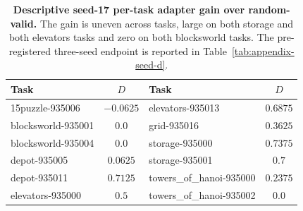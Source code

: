 \begin{table}[t]
\caption{\textbf{Descriptive seed-17 per-task adapter gain over random-valid.} The gain is uneven across tasks, large on both storage and both elevators tasks and zero on both blocksworld tasks. The pre-registered three-seed endpoint is reported in Table~\ref{tab:appendix-seed-d}.}
\label{tab:appendix-adapter-tasks}
\centering\footnotesize
\setlength{\tabcolsep}{3pt}
\begin{tabular}{@{}lc|lc@{}}
\toprule[0.4mm]
\rowcolor{mygray}\textbf{Task} & \textbf{$D$} & \textbf{Task} & \textbf{$D$} \\
\midrule
15puzzle-935006 & $-0.0625$ & elevators-935013 & $0.6875$ \\
blocksworld-935001 & $0.0$ & grid-935016 & $0.3625$ \\
blocksworld-935004 & $0.0$ & storage-935000 & $0.7375$ \\
depot-935005 & $0.0625$ & storage-935001 & $0.7$ \\
depot-935011 & $0.7125$ & towers\_of\_hanoi-935000 & $0.2375$ \\
elevators-935000 & $0.5$ & towers\_of\_hanoi-935002 & $0.0$ \\
\bottomrule
\end{tabular}
\end{table}

